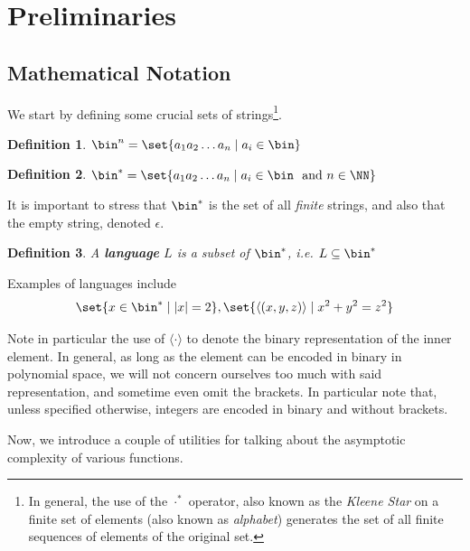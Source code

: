 \documentclass{article}
\newtheorem{definition}{Definition}
\begin{document}
\section{Preliminaries}
\label{preliminaries}
\subsection{Mathematical Notation}
We start by defining some crucial sets of strings\footnote{In general, the use of the $\cdot ^ *$ operator, also known as the \textit{Kleene Star} on a finite set of elements (also known as \textit{alphabet}) generates the set of all finite sequences of elements of the original set.}.
\begin{definition}
    $\bin^n = \set{ a_1 a_2 \dots a_n \mid a_i \in \bin}$
\end{definition}
\begin{definition}
    $\bin^* = \set{ a_1 a_2 \dots a_n \mid a_i \in \bin \text{ \normalfont{ and }} n \in \NN }$
\end{definition}

It is important to stress that $\bin^*$ is the set of all \textit{finite} strings, and also that the empty string, denoted $\epsilon$.

\begin{definition}
    A \textbf{language} $L$ is a subset of $\bin^*$, i.e. $L \subseteq \bin^*$
\end{definition}

Examples of languages include
\[ \set{ x \in \bin^* \mid |x| = 2 }, \set{ \langle(x, y, z)\rangle \mid x^2 + y^2 = z^2 } \]

Note in particular the use of $\langle \cdot \rangle$ to denote the binary representation of the inner element. In general, as long as the element can be encoded in binary in polynomial space, we will not concern ourselves too much with said representation, and sometime even omit the brackets. In particular note that, unless specified otherwise, integers are encoded in binary and without brackets.  \par

Now, we introduce a couple of utilities for talking about the asymptotic complexity of various functions.
\end{document}
